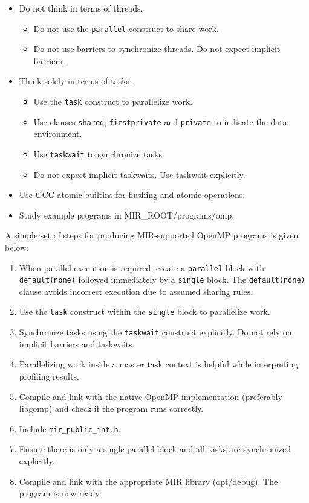 \documentclass[11pt,a4paper]{article}
\begin{document}
\begin{itemize}
	\item Do not think in terms of threads.
    \begin{itemize}
        \item Do not use the \texttt{parallel} construct to share work.
        \item Do not use barriers to synchronize threads. Do not expect implicit barriers.
    \end{itemize}
	\item Think solely in terms of tasks.
    \begin{itemize}
        \item Use the \texttt{task} construct to parallelize work.
        \item Use clauses \texttt{shared}, \texttt{firstprivate} and \texttt{private} to indicate the data environment.
        \item Use \texttt{taskwait} to synchronize tasks.
        \item Do not expect implicit taskwaits. Use taskwait explicitly.
    \end{itemize}
	\item Use GCC atomic builtins for flushing and atomic operations.
	\item Study example programs in MIR\_ROOT/programs/omp.
\end{itemize}

A simple set of steps for producing MIR-supported OpenMP programs is given below:

\begin{enumerate}
\item When parallel execution is required, create a \texttt{parallel}  block with \texttt{default(none)} followed immediately by a \texttt{single} block. The \texttt{default(none)} clause avoids incorrect execution due to assumed sharing rules.
\item Use the \texttt{task} construct within the \texttt{single} block to parallelize work.
\item Synchronize tasks using the \texttt{taskwait} construct explicitly. Do not rely on implicit barriers and taskwaits.
\item Parallelizing work inside a master task context is helpful while interpreting profiling results.
\item Compile and link with the native OpenMP implementation (preferably libgomp) and check if the program runs correctly.
\item Include \texttt{mir\_public\_int.h}.
\item Ensure there is only a single parallel block and all tasks are synchronized explicitly.
\item Compile and link with the appropriate MIR library (opt/debug). The program is now ready.
\end{enumerate}
\end{document}
